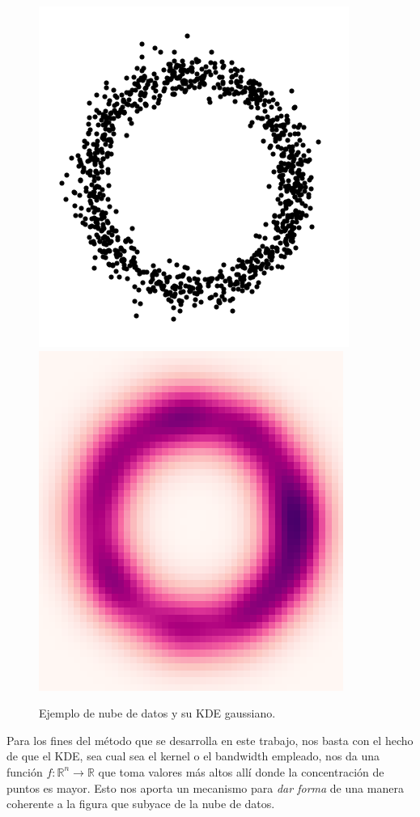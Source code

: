 \documentclass[12pt,a4paper,twoside]{article} %
\theoremstyle{plain}
\theoremstyle{definition}
\newcommand{\R}{\mathbb{R}}
\newcommand{\map}[3]{#1 \colon #2 \to #3}
\begin{document}
\begin{figure}[h!]
\centering
\includegraphics[scale=0.45]{img/cloudzoom.png}
\includegraphics[scale=0.45]{img/kdezoom.png}
\caption{Ejemplo de nube de datos y su KDE gaussiano.}
\label{kde}
\end{figure}

Para los fines del método que se desarrolla en este trabajo, nos basta con el hecho de que el KDE, sea cual sea el kernel o el bandwidth empleado, nos da una función $\map{f}{\R^n}{\R}$ que toma valores más altos allí donde la concentración de puntos es mayor. Esto nos aporta un mecanismo para \emph{dar forma} de una manera coherente a la figura que subyace de la nube de datos.
\end{document}
